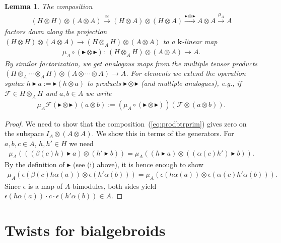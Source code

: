 \documentclass[pdftex]{sigma}
\newtheorem{Lemma}[Theorem]{Lemma}
\numberwithin{equation}{section}
\begin{document}
\begin{Lemma}\label{lem:prodbtr}
The composition
\begin{gather}\label{eq:prodbtrprim}
(H\otimes H)\otimes (A\otimes A) \stackrel\cong\longrightarrow (H\otimes A) \otimes (H\otimes A)\stackrel{\blacktriangleright\otimes\blacktriangleright}\longrightarrow A\otimes A\stackrel{\mu_A}\longrightarrow A
\end{gather}
factors down along the projection $(H\otimes H)\otimes(A\otimes A) \to (H\otimes_A H)\otimes(A\otimes A)$ to a $\mathbf{k}$-linear map
\begin{gather*}
\mu_A\circ(\blacktriangleright\otimes\blacktriangleright)\colon \ (H\otimes_A H)\otimes (A\otimes A)\longrightarrow A.
\end{gather*}
By similar factorization, we get analogous maps from the multiple tensor products $(H\otimes_A\cdots\otimes_A H)\otimes(A\otimes\cdots\otimes A)\to A$. For elements we extend the operation syntax $h\blacktriangleright a := \blacktriangleright (h\otimes a)$ to products $\blacktriangleright\otimes\blacktriangleright$ (and multiple analogues), e.g., if $\mathcal{F}\in H\otimes_A H$ and $a,b\in A$ we write
\begin{gather*}\mu_A \mathcal{F}(\blacktriangleright\otimes\blacktriangleright)(a\otimes b):= (\mu_A\circ(\blacktriangleright\otimes\blacktriangleright))(\mathcal{F}
\otimes (a\otimes b)).\end{gather*}
\end{Lemma}
\begin{proof} We need to show that the composition~(\ref{eq:prodbtrprim}) gives zero on the subspace $I_A\otimes(A\otimes A)$. We show this in terms of the generators. For $a,b,c\in A$, $h,h'\in H$ we need
\begin{gather*}
\mu_A (((\beta(c) h)\blacktriangleright a)\otimes (h'\blacktriangleright b)) = \mu_A ((h\blacktriangleright a)\otimes((\alpha(c)h')\blacktriangleright b)).
\end{gather*}
By the definition of $\blacktriangleright$ (see (i) above), it is hence enough to show
\begin{gather*}
\mu_A (\epsilon(\beta(c) h \alpha(a))\otimes\epsilon(h'\alpha(b)))= \mu_A (\epsilon(h\alpha(a))\otimes\epsilon(\alpha(c)h'\alpha(b))).
\end{gather*}
Since $\epsilon$ is a map of $A$-bimodules, both sides yield $\epsilon(h\alpha(a)) \cdot c\cdot \epsilon(h' \alpha(b))\in A$.
\end{proof}

\section{Twists for bialgebroids}\label{s:gentwist}
\end{document}
